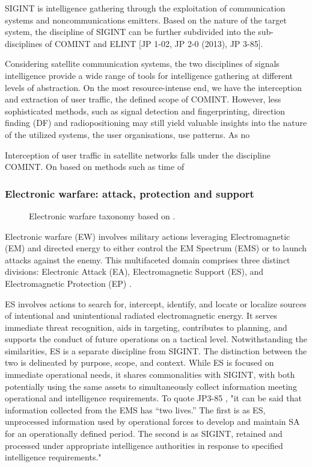 \documentclass[english, 12pt, a4paper, elec, utf8, a-1b, online]{aaltothesis}
\begin{document}
SIGINT is intelligence gathering through the exploitation of communication systems and noncommunications emitters.
Based on the nature of the target system, the discipline of SIGINT can be further subdivided into the sub-disciplines of COMINT and ELINT \cite{national2015bulk} [JP 1-02, JP 2-0 (2013), JP 3-85].

Considering satellite communication systems, the two disciplines of signals intelligence provide a wide range of tools for intelligence gathering at different levels of abstraction.
On the most resource-intense end, we have the interception and extraction of user traffic, the defined scope of COMINT.
However, less sophisticated methods, such as signal detection and fingerprinting, direction finding (DF) and radiopositioning may still yield valuable insights into the nature of the utilized systems, the user organisations, use patterns.
As no %

Interception of user traffic in satellite networks falls under the discipline COMINT. On based on methods such as time of %

\subsubsection{Electronic warfare: attack, protection and support}

\begin{figure}[h]
  \centering
  
  \caption{Electronic warfare taxonomy based on \cite{kosola2013digitaalinen}.}
  \label{fig-electronic-warfare}
\end{figure}

Electronic warfare (EW) involves military actions leveraging Electromagnetic (EM) and directed energy to either control the EM Spectrum (EMS) or to launch attacks against the enemy. This multifaceted domain comprises three distinct divisions: Electronic Attack (EA), Electromagnetic Support (ES), and Electromagnetic Protection (EP) \cite{jp3-85,kosola2013digitaalinen}.

ES involves actions to search for, intercept, identify, and locate or localize sources of intentional and unintentional radiated electromagnetic energy. It serves immediate threat recognition, aids in targeting, contributes to planning, and supports the conduct of future operations on a tactical level. Notwithstanding the similarities, ES is a separate discipline from SIGINT. The distinction between the two is delineated by purpose, scope, and context. While ES is focused on immediate operational needs, it shares commonalities with SIGINT, with both potentially using the same assets to simultaneously collect information meeting operational and intelligence requirements.
To quote JP3-85 \cite{jp3-85}, "it can be said that information collected from the EMS has “two lives.”
The first is as ES, unprocessed information used by operational forces to develop and maintain SA for an operationally defined period.
The second is as SIGINT, retained and processed under appropriate intelligence authorities in response to specified intelligence requirements." %
\end{document}
